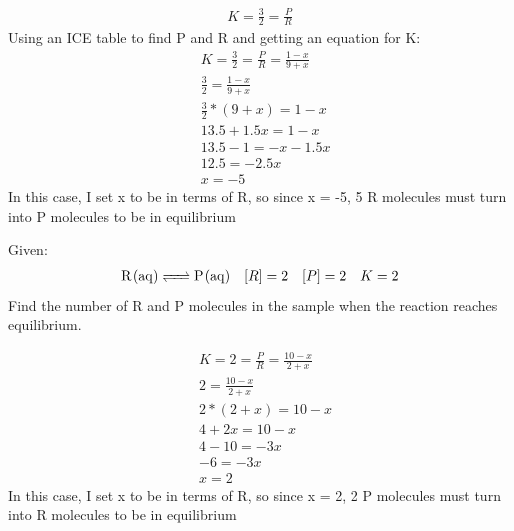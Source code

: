 \documentclass{article}  %
\begin{document}
\begin{equation*}
    \begin{aligned}
        K = \frac{3}{2} = \frac{P}{R}
    \end{aligned}
\end{equation*}
Using an ICE table to find P and R and getting an equation for K:
\begin{equation*}
    \begin{aligned}
        &K = \frac{3}{2} = \frac{P}{R} = \frac{1-x}{9+x} \\
        &\frac{3}{2} = \frac{1-x}{9+x} \\
        &\frac{3}{2}*(9+x) = 1-x \\
        &13.5+1.5x = 1-x \\
        &13.5-1 = -x-1.5x \\
        &12.5 = -2.5x \\
        &x = -5
    \end{aligned}
\end{equation*}
In this case, I set x to be in terms of R, so since x = -5, 5 R molecules must turn into P molecules to be in equilibrium

Given:\\
\begin{equation*}
    \begin{aligned}
        \ce{R_(aq) <=> P_(aq)} \quad [R] = 2 \quad [P] = 2 \quad K = 2
    \end{aligned}
\end{equation*} 
Find the number of R and P molecules in the sample when the reaction reaches equilibrium.

\begin{equation*}
    \begin{aligned}
        &K = 2 = \frac{P}{R} = \frac{10-x}{2+x} \\
        &2 = \frac{10-x}{2+x} \\
        &2*(2+x) = 10-x \\
        &4+2x = 10-x \\
        &4-10 = -3x \\
        &-6 = -3x \\
        &x = 2
    \end{aligned}
\end{equation*}
In this case, I set x to be in terms of R, so since x = 2, 2 P molecules must turn into R molecules to be in equilibrium
\end{document}
